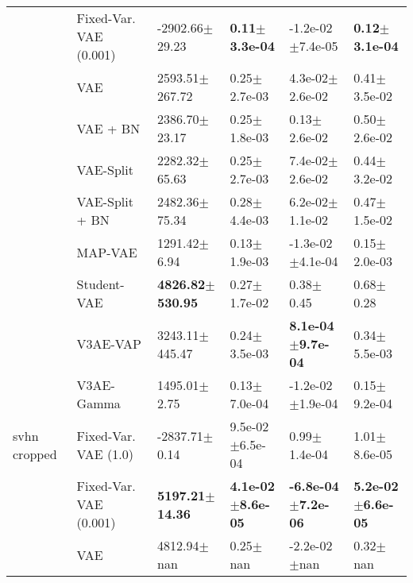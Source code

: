 \begin{tabular}{llllll}
             & Fixed-Var. VAE (0.001) &           -2902.66$\pm$29.23 &     \textbf{0.11$\pm$3.3e-04} &           -1.2e-02$\pm$7.4e-05 &     \textbf{0.12$\pm$3.1e-04} \\
             & VAE &           2593.51$\pm$267.72 &              0.25$\pm$2.7e-03 &            4.3e-02$\pm$2.6e-02 &              0.41$\pm$3.5e-02 \\
             & VAE + BN &            2386.70$\pm$23.17 &              0.25$\pm$1.8e-03 &               0.13$\pm$2.6e-02 &              0.50$\pm$2.6e-02 \\
             & VAE-Split &            2282.32$\pm$65.63 &              0.25$\pm$2.7e-03 &            7.4e-02$\pm$2.6e-02 &              0.44$\pm$3.2e-02 \\
             & VAE-Split + BN &            2482.36$\pm$75.34 &              0.28$\pm$4.4e-03 &            6.2e-02$\pm$1.1e-02 &              0.47$\pm$1.5e-02 \\
             & MAP-VAE &             1291.42$\pm$6.94 &              0.13$\pm$1.9e-03 &           -1.3e-02$\pm$4.1e-04 &              0.15$\pm$2.0e-03 \\
             & Student-VAE &  \textbf{4826.82$\pm$530.95} &              0.27$\pm$1.7e-02 &                  0.38$\pm$0.45 &                 0.68$\pm$0.28 \\
             & V3AE-VAP &           3243.11$\pm$445.47 &              0.24$\pm$3.5e-03 &   \textbf{8.1e-04$\pm$9.7e-04} &              0.34$\pm$5.5e-03 \\
             & V3AE-Gamma &             1495.01$\pm$2.75 &              0.13$\pm$7.0e-04 &           -1.2e-02$\pm$1.9e-04 &              0.15$\pm$9.2e-04 \\
svhn cropped & Fixed-Var. VAE (1.0) &            -2837.71$\pm$0.14 &           9.5e-02$\pm$6.5e-04 &               0.99$\pm$1.4e-04 &              1.01$\pm$8.6e-05 \\
             & Fixed-Var. VAE (0.001) &   \textbf{5197.21$\pm$14.36} &  \textbf{4.1e-02$\pm$8.6e-05} &  \textbf{-6.8e-04$\pm$7.2e-06} &  \textbf{5.2e-02$\pm$6.6e-05} \\
             & VAE &              4812.94$\pm$nan &                  0.25$\pm$nan &               -2.2e-02$\pm$nan &                  0.32$\pm$nan \\
\bottomrule
\end{tabular}

